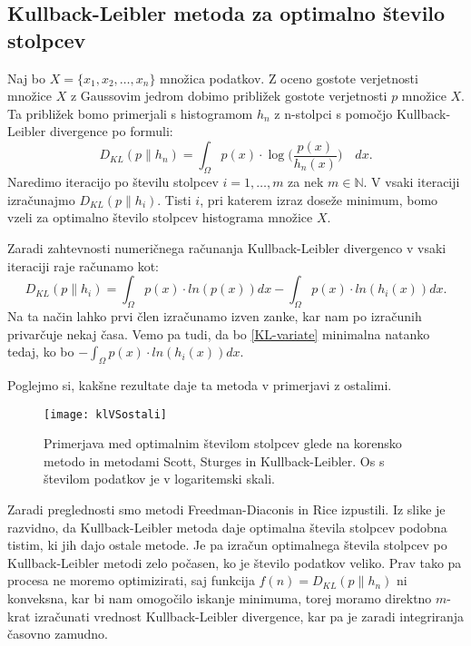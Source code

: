 
\subsection{Kullback-Leibler metoda za optimalno število stolpcev}

Naj bo $X = \{x_1, x_2, \ldots, x_n\}$ množica podatkov. Z oceno gostote verjetnosti množice $X$ z Gaussovim jedrom dobimo približek gostote verjetnosti $p$ množice $X$. Ta približek bomo primerjali s histogramom $h_n$ z n-stolpci s pomočjo Kullback-Leibler divergence po formuli:
\begin{equation}
    D_{KL}(p\|h_n) = \int_{\Omega}p(x)\cdot\log\Big(\frac{p(x)}{h_n(x)}\Big)\quad dx.
\end{equation}
Naredimo iteracijo po številu stolpcev $i = 1, \ldots, m$ za nek $m \in \mathbb{N}$. V vsaki iteraciji izračunajmo $D_{KL}(p\|h_i)$. Tisti $i$, pri katerem izraz doseže minimum, bomo vzeli za optimalno število stolpcev histograma množice $X$.

\begin{opomba}
    Zaradi zahtevnosti numeričnega računanja Kullback-Leibler divergenco v vsaki iteraciji raje računamo kot:
    \begin{equation}\label{KL-variate}
        D_{KL}(p\|h_i) = \int_\Omega p(x) \cdot ln(p(x)) dx - \int_\Omega p(x) \cdot ln(h_i(x)) dx.
    \end{equation}
    Na ta način lahko prvi člen izračunamo izven zanke, kar nam po izračunih privarčuje nekaj časa. Vemo pa tudi, da bo \eqref{KL-variate} minimalna natanko tedaj, ko bo $- \int_\Omega p(x) \cdot ln(h_i(x)) dx$.
\end{opomba}
\pagebreak
Poglejmo si, kakšne rezultate daje ta metoda v primerjavi z ostalimi.
\begin{figure}[!h]
    \centering
    \texttt{[image: klVSostali]}
    \caption{Primerjava med optimalnim številom stolpcev glede na korensko metodo in metodami Scott, Sturges in Kullback-Leibler. Os s številom podatkov je v logaritemski skali.}
\end{figure}

Zaradi preglednosti smo metodi Freedman-Diaconis in Rice izpustili. Iz slike je razvidno, da Kullback-Leibler metoda daje optimalna števila stolpcev podobna tistim, ki jih dajo ostale metode. Je pa izračun optimalnega števila stolpcev po Kullback-Leibler metodi zelo počasen, ko je število podatkov veliko. Prav tako pa procesa ne moremo optimizirati, saj funkcija $f(n) = D_{KL}(p\|h_n)$ ni konveksna, kar bi nam omogočilo iskanje minimuma, torej moramo direktno $m$-krat izračunati vrednost Kullback-Leibler divergence, kar pa je zaradi integriranja časovno zamudno.